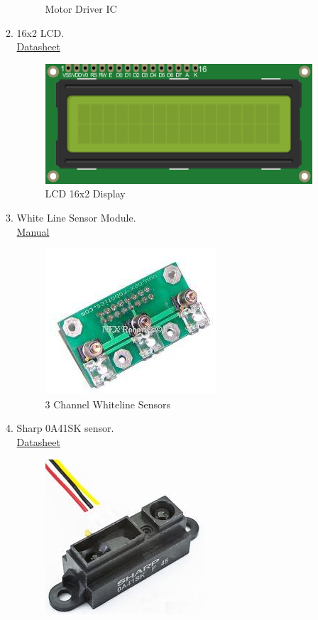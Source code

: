 \documentclass[a4paper,12pt,oneside]{book}
\begin{document}
\begin{itemize}
\begin{enumerate}
\begin{figure}[!ht]
        \caption{Motor Driver IC}
      \end{figure}
      \newpage
    \item 16x2 LCD.\\
    \href{http://www.engineersgarage.com/sites/default/files/LCD\%2016x2.pdf}{ Datasheet}\par
   \begin{figure}[!ht]
        \centering
        \includegraphics[scale=0.85]{lcd}
        \caption{LCD 16x2 Display}
      \end{figure}
    \item White Line Sensor Module.\\
    \href{http://www.nex-robotics.com/images/downloads/3\%20channel\%20line\%20sensor.pdf}{ Manual}\par
   \begin{figure}[!ht]
        \centering
        \includegraphics[scale=0.85]{whiteline}
        \caption{3 Channel Whiteline Sensors}
      \end{figure}
    \item Sharp 0A41SK sensor.\\
    \href{http://www.Sharp-world.com/products/device/lineup/data/pdf/datasheet/gp2y0a41sk_e.pdf}{ Datasheet}\par
   \begin{figure}[!ht]
        \centering
        \includegraphics[scale=0.8]{Sharp}

\end{figure}
\end{enumerate}
\end{itemize}
\end{document}
